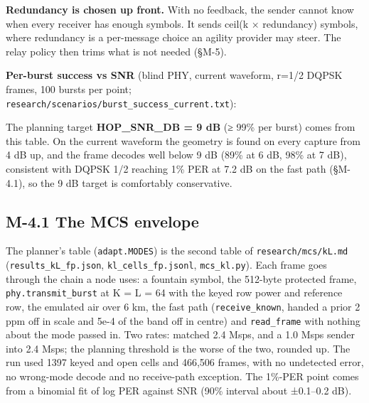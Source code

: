 \documentclass[10pt,letterpaper,twocolumn]{article}
\begin{document}
\textbf{Redundancy is chosen up front.} With no feedback, the sender cannot know when every receiver has enough symbols. It sends ceil(k × redundancy) symbols, where redundancy is a per-message choice an agility provider may steer. The relay policy then trims what is not needed (§M-5).

\textbf{Per-burst success vs SNR} (blind PHY, current waveform, r=1/2 DQPSK frames, 100 bursts per point; \texttt{research/\allowbreak{}scenarios/\allowbreak{}burst\_\allowbreak{}success\_\allowbreak{}current.\allowbreak{}txt}):


The planning target \textbf{HOP\_SNR\_DB = 9 dB} (≥ 99\% per burst) comes from this table. On the current waveform the geometry is found on every capture from 4 dB up, and the frame decodes well below 9 dB (89\% at 6 dB, 98\% at 7 dB), consistent with DQPSK 1/2 reaching 1\% PER at 7.2 dB on the fast path (§M-4.1), so the 9 dB target is comfortably conservative.

\subsection{M-4.1 The MCS envelope}\label{m-41-the-mcs-envelope}

The planner's table (\texttt{adapt.\allowbreak{}MODES}) is the second table of \texttt{research/\allowbreak{}mcs/\allowbreak{}kL.\allowbreak{}md} (\texttt{results\_\allowbreak{}kL\_\allowbreak{}fp.\allowbreak{}json}, \texttt{kl\_\allowbreak{}cells\_\allowbreak{}fp.\allowbreak{}jsonl}, \texttt{mcs\_\allowbreak{}kl.\allowbreak{}py}). Each frame goes through the chain a node uses: a fountain symbol, the 512-byte protected frame, \texttt{phy.\allowbreak{}transmit\_\allowbreak{}burst} at K = L = 64 with the keyed row power and reference row, the emulated air over 6 km, the fast path (\texttt{receive\_\allowbreak{}known}, handed a prior 2 ppm off in scale and 5e-4 of the band off in centre) and \texttt{read\_\allowbreak{}frame} with nothing about the mode passed in. Two rates: matched 2.4 Msps, and a 1.0 Msps sender into 2.4 Msps; the planning threshold is the worse of the two, rounded up. The run used 1397 keyed and open cells and 466,506 frames, with no undetected error, no wrong-mode decode and no receive-path exception. The 1\%-PER point comes from a binomial fit of log PER against SNR (90\% interval about ±0.1--0.2 dB).
\end{document}
